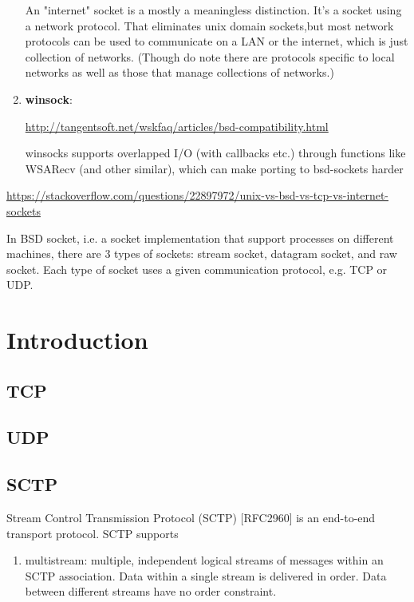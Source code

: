 \begin{enumerate}
  An "internet" socket is a mostly a meaningless distinction. It's a socket
  using a network protocol. That eliminates unix domain sockets,but most network
  protocols can be used to communicate on a LAN or the internet, which is just
  collection of networks. (Though do note there are protocols specific to local
  networks as well as those that manage collections of networks.)   
  
  \item {\bf winsock}: 
  
  \url{http://tangentsoft.net/wskfaq/articles/bsd-compatibility.html}
  
  winsocks supports overlapped I/O (with callbacks etc.) through functions like
   WSARecv (and other similar), which can make porting to bsd-sockets harder
   
\end{enumerate}
\url{https://stackoverflow.com/questions/22897972/unix-vs-bsd-vs-tcp-vs-internet-sockets}

In BSD socket, i.e. a socket implementation that support processes on different
machines, there are 3 types of sockets: stream socket, datagram socket, and raw
socket. Each type of socket uses a given communication protocol, e.g. TCP or
UDP.



\section{Introduction}

\subsection{TCP}

\subsection{UDP}

\subsection{SCTP}

Stream Control Transmission Protocol (SCTP) [RFC2960] is an end-to-end transport
protocol. SCTP supports
\begin{enumerate}
  \item multistream: multiple, independent logical streams of messages within an
  SCTP association. Data within a single stream is delivered in order. Data
  between different streams have no order constraint. 
\end{enumerate}

